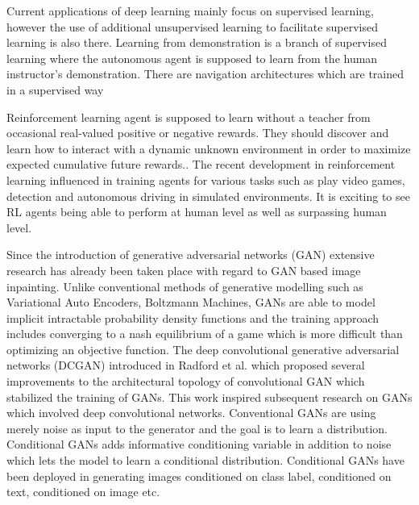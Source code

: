 Current applications of deep learning mainly focus on supervised learning, however the use of additional unsupervised learning to facilitate supervised learning is also there\cite{schmidhuber2015deep}. Learning from demonstration\cite{stafylopatis1998autonomous} is a branch of supervised learning where the autonomous agent is supposed to learn from the human instructor's demonstration. There are navigation architectures which are trained in a supervised way\cite{pomerleau1989alvinn,bojarski2016end}

Reinforcement learning agent is supposed to learn without a teacher from occasional real-valued positive or negative rewards. They should discover and learn how to interact with a dynamic unknown environment in order to maximize expected cumulative future rewards.\cite{schmidhuber2015deep}. The recent development in reinforcement learning influenced in training agents for various tasks such as play video games\cite{mnih2013playing,silver2016mastering,silver2017mastering}, detection\cite{mnih2014recurrent} and autonomous driving in simulated environments\cite{abbeel2004apprenticeship,lillicrap2015continuous}. It is exciting to see RL agents being able to perform at human level\cite{mnih2015human} as well as surpassing human level\cite{silver2016mastering,silver2017mastering}.

Since the introduction of generative adversarial networks (GAN)\cite{goodfellow2014generative} extensive research has already been taken place with regard to GAN based image inpainting. Unlike conventional methods of generative modelling such as Variational Auto Encoders\cite{kingma2013auto}, Boltzmann Machines\cite{salakhutdinov2007restricted, salakhutdinov09},  GANs are able to model implicit intractable probability density functions and the training approach includes converging to a nash equilibrium of a game which is more difficult than optimizing an objective function\cite{goodfellow2016nips}. The deep convolutional generative adversarial networks (DCGAN) introduced in Radford et al.\cite{radford2015unsupervised} which proposed several improvements to the architectural topology of convolutional GAN which stabilized the training of GANs. This work inspired subsequent research on GANs which involved deep convolutional networks. Conventional GANs are using merely noise as input to the generator and the goal is to learn a distribution. Conditional GANs adds informative conditioning variable in addition to noise which lets the model to learn a conditional distribution. Conditional GANs have been deployed in generating images conditioned on class label\cite{mirza2014conditional}, conditioned on text\cite{reed2016generative}, conditioned on image\cite{isola2017image} etc.


 

 
